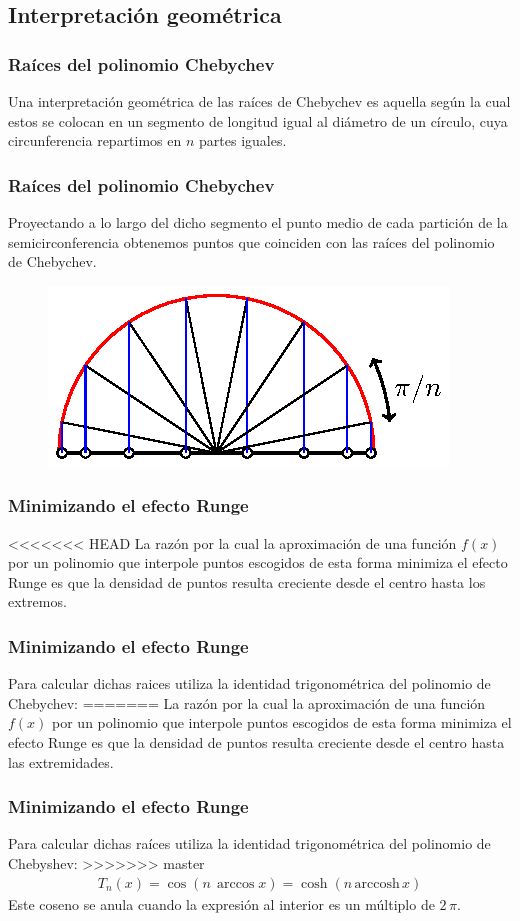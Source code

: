 \subsection{Interpretación geométrica}
\begin{frame}
\frametitle{Raíces del polinomio Chebychev}
Una interpretación geométrica de las raíces de Chebychev es aquella según la cual estos se colocan en un segmento de longitud igual al diámetro de un círculo, cuya circunferencia repartimos en $n$ partes iguales.
\end{frame}
\begin{frame}
\frametitle{Raíces del polinomio Chebychev}
Proyectando a lo largo del dicho segmento el punto medio de cada partición de la semicirconferencia obtenemos puntos que coinciden con las raíces del polinomio de Chebychev.
\begin{figure}
    \centering
    \includegraphics[scale=1]{Imagenes/Nodos_Chebychev_01.eps}
\end{figure}
\end{frame}
\begin{frame}
\frametitle{Minimizando el efecto Runge}
<<<<<<< HEAD
La razón por la cual la aproximación de una función $f(x)$ por un polinomio que interpole puntos escogidos de esta forma minimiza el efecto Runge es que la densidad de puntos resulta creciente desde el centro hasta los extremos.
\end{frame}
\begin{frame}
\frametitle{Minimizando el efecto Runge}
Para calcular dichas raices utiliza la identidad trigonométrica del polinomio de Chebychev:
=======
La razón por la cual la aproximación de una función $f(x)$ por un polinomio que interpole puntos escogidos de esta forma minimiza el efecto Runge es que la densidad de puntos resulta creciente desde el centro hasta las extremidades.
\end{frame}
\begin{frame}
\frametitle{Minimizando el efecto Runge}
Para calcular dichas raíces utiliza la identidad trigonométrica del polinomio de Chebyshev:
>>>>>>> master
\begin{align*}
T_{n}(x) = \cos (n \, \arccos x) = \cosh (n \, \mbox{arccosh} \, x)
\end{align*}
\pause
Este coseno se anula cuando la expresión al interior es un múltiplo de $2 \, \pi$.
\end{frame}
